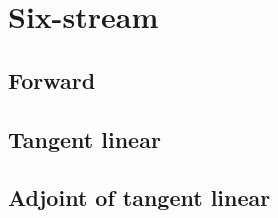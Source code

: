 %
\section{Six-stream}
\label{sec:six_stream}


\subsection{Forward}
\label{sec:six_stream-forward}


%
\subsection{Tangent linear}
\label{sec:six_stream-tangent_linear}


%
\subsection{Adjoint of tangent linear}
\label{sec:six_stream-adjoint_of_tangent_linear}
